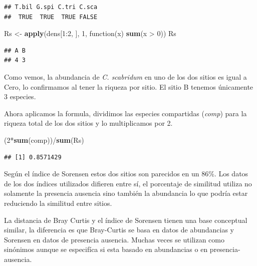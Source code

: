 \documentclass[]{book}
\newenvironment{Shaded}{\begin{snugshade}}{\end{snugshade}}
\newcommand{\KeywordTok}[1]{\textcolor[rgb]{0.13,0.29,0.53}{\textbf{{#1}}}}
\newcommand{\DecValTok}[1]{\textcolor[rgb]{0.00,0.00,0.81}{{#1}}}
\newcommand{\StringTok}[1]{\textcolor[rgb]{0.31,0.60,0.02}{{#1}}}
\newcommand{\NormalTok}[1]{{#1}}
\begin{document}
\begin{verbatim}
## T.bil G.spi C.tri C.sca 
##  TRUE  TRUE  TRUE FALSE
\end{verbatim}

\begin{Shaded}
\begin{Highlighting}[]
\NormalTok{Rs <-}\StringTok{ }\KeywordTok{apply}\NormalTok{(dens[}\DecValTok{1}\NormalTok{:}\DecValTok{2}\NormalTok{, ], }\DecValTok{1}\NormalTok{, function(x) }\KeywordTok{sum}\NormalTok{(x >}\StringTok{ }\DecValTok{0}\NormalTok{))}
\NormalTok{Rs}
\end{Highlighting}
\end{Shaded}

\begin{verbatim}
## A B 
## 4 3
\end{verbatim}

Como vemos, la abundancia de \emph{C. scabridum} en uno de los dos
sitios es igual a Cero, lo confirmamos al tener la riqueza por sitio. El
sitio B tenemos únicamente 3 especies.

Ahora aplicamos la formula, dividimos las especies compartidas
(\emph{comp}) para la riqueza total de los dos sitios y lo multiplicamos
por 2.

\begin{Shaded}
\begin{Highlighting}[]
\NormalTok{(}\DecValTok{2}\NormalTok{*}\KeywordTok{sum}\NormalTok{(comp))/}\KeywordTok{sum}\NormalTok{(Rs)}
\end{Highlighting}
\end{Shaded}

\begin{verbatim}
## [1] 0.8571429
\end{verbatim}

Según el índice de Sorensen estos dos sitios son parecidos en un 86\%.
Los datos de los dos índices utilizados difieren entre sí, el porcentaje
de similitud utiliza no solamente la presencia ausencia sino también la
abundancia lo que podría estar reduciendo la similitud entre sitios.

\begin{FOO}
La distancia de Bray Curtis y el índice de Sorensen tienen una base
conceptual similar, la diferencia es que Bray-Curtis se basa en datos de
abundancias y Sorensen en datos de presencia ausencia. Muchas veces se
utilizan como sinónimos aunque se especifíca si esta basado en
abundancias o en presencia-ausencia.
\end{FOO}
\end{document}
